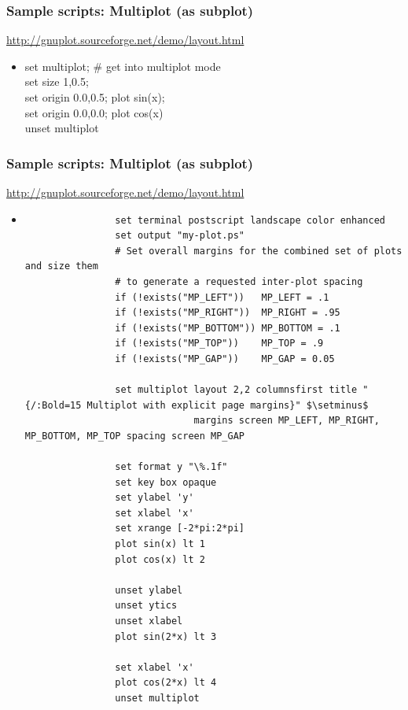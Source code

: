 \documentclass{beamer}
\begin{document}
		\begin{frame}
		\frametitle{Sample scripts: Multiplot (as subplot)}
			\url{http://gnuplot.sourceforge.net/demo/layout.html}
			\begin{itemize}
			\item	set multiplot; \# get into multiplot mode\\
			 set size 1,0.5;\\
			 set origin 0.0,0.5; plot sin(x);\\
			 set origin 0.0,0.0; plot cos(x)\\
			 unset multiplot 
			\end{itemize}		
		\end{frame}
		\begin{frame}
		\frametitle{Sample scripts: Multiplot (as subplot)}
			\scriptsize
			\url{http://gnuplot.sourceforge.net/demo/layout.html}
			\begin{itemize}
			
			\item	
			\begin{verbatim}
				set terminal postscript landscape color enhanced
				set output "my-plot.ps" 
				# Set overall margins for the combined set of plots and size them
				# to generate a requested inter-plot spacing
				if (!exists("MP_LEFT"))   MP_LEFT = .1
				if (!exists("MP_RIGHT"))  MP_RIGHT = .95
				if (!exists("MP_BOTTOM")) MP_BOTTOM = .1
				if (!exists("MP_TOP"))    MP_TOP = .9
				if (!exists("MP_GAP"))    MP_GAP = 0.05
				
				set multiplot layout 2,2 columnsfirst title "{/:Bold=15 Multiplot with explicit page margins}" $\setminus$
				              margins screen MP_LEFT, MP_RIGHT, MP_BOTTOM, MP_TOP spacing screen MP_GAP
				
				set format y "\%.1f"
				set key box opaque
				set ylabel 'y'
				set xlabel 'x'
				set xrange [-2*pi:2*pi]
				plot sin(x) lt 1
				plot cos(x) lt 2
				
				unset ylabel
				unset ytics	
				unset xlabel
				plot sin(2*x) lt 3
				
				set xlabel 'x'
				plot cos(2*x) lt 4
				unset multiplot	
			\end{verbatim}
			
					
					
					
			\end{itemize}	
		\end{frame}
\end{document}
